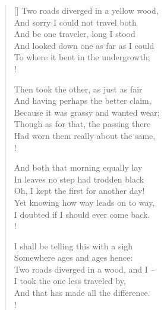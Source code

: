 \documentclass[11pt, a4paper]{article} %
\begin{document}

\settowidth{\versewidth}{Because it was grassy and wanted wear;} %
\begin{verse}[\versewidth]
Two roads diverged in a yellow wood, \\
And sorry I could not travel both \\
And be one traveler, long I stood \\
And looked down one as far as I could \\
To where it bent in the undergrowth; \\!


Then took the other, as just as fair \\
And having perhaps the better claim, \\
Because it was grassy and wanted wear; \\
Though as for that, the passing there \\
Had worn them really about the same, \\!


And both that morning equally lay \\
In leaves no step had trodden black \\
Oh, I kept the first for another day! \\
Yet knowing how way leads on to way, \\
I doubted if I should ever come back. \\!


I shall be telling this with a sigh \\
Somewhere ages and ages hence: \\
Two roads diverged in a wood, and I -- \\
I took the one less traveled by, \\
And that has made all the difference. \\!
\end{verse}

\end{document}
